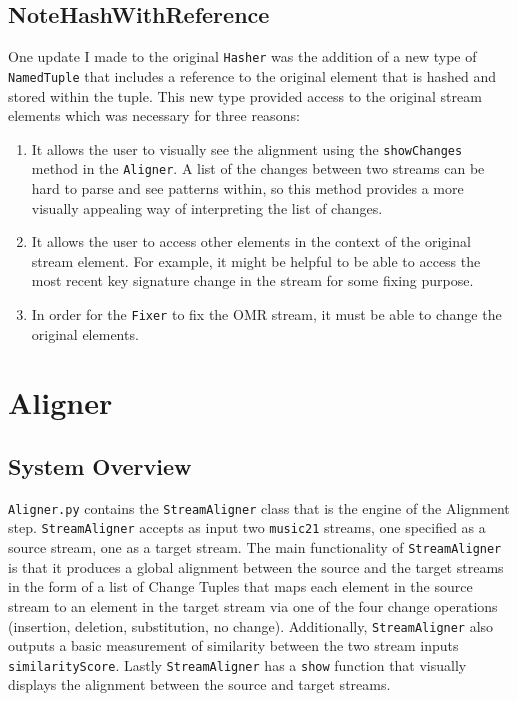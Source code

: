 \subsection{NoteHashWithReference}
One update I made to the original \texttt{Hasher} was the addition of a new type of \texttt{NamedTuple} that includes a reference to the original element that is hashed and stored within the tuple. This new type provided access to the original stream elements which was necessary for three reasons:
\begin{enumerate}
\item It allows the user to visually see the alignment using the \texttt{showChanges} method in the \texttt{Aligner}. A list of the changes between two streams can be hard to parse and see patterns within, so this method provides a more visually appealing way of interpreting the list of changes.
\item It allows the user to access other elements in the context of the original stream element. For example, it might be helpful to be able to access the most recent key signature change in the stream for some fixing purpose. 
\item In order for the \texttt{Fixer} to fix the OMR stream, it must be able to change the original elements. 
\end{enumerate}

\section{Aligner} \label{aligner}
\subsection{System Overview}
\texttt{Aligner.py} contains the \texttt{StreamAligner} class that is the engine of the Alignment step. \texttt{StreamAligner} accepts as input two \texttt{music21} streams, one specified as a source stream, one as a target stream. The main functionality of \texttt{StreamAligner} is that it produces a global alignment between the source and the target streams in the form of a list of Change Tuples that maps each element in the source stream to an element in the target stream via one of the four change operations (insertion, deletion, substitution, no change). Additionally, \texttt{StreamAligner} also outputs a basic measurement of similarity between the two stream inputs \texttt{similarityScore}. Lastly \texttt{StreamAligner} has a \texttt{show} function that visually displays the alignment between the source and target streams. 

